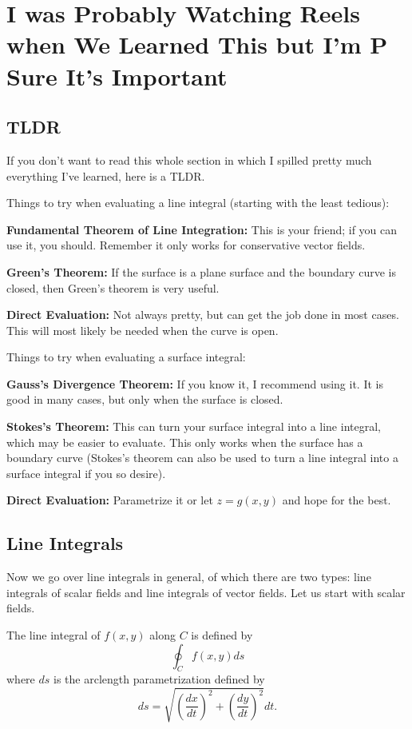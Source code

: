 \chapter{I was Probably Watching Reels when We Learned This but I'm P Sure It's Important}

\section{TLDR}

If you don't want to read this whole section in which I spilled pretty much everything I've learned, here is a TLDR.

Things to try when evaluating a line integral (starting with the least tedious):

\textbf{Fundamental Theorem of Line Integration:} This is your friend; if you can use it, you should. Remember it only works for conservative vector fields.

\textbf{Green's Theorem:} If the surface is a plane surface and the boundary curve is closed, then Green's theorem is very useful.

\textbf{Direct Evaluation:} Not always pretty, but can get the job done in most cases. This will most likely be needed when the curve is open.

Things to try when evaluating a surface integral:

\textbf{Gauss's Divergence Theorem:} If you know it, I recommend using it. It is good in many cases, but only when the surface is closed.

\textbf{Stokes's Theorem:} This can turn your surface integral into a line integral, which may be easier to evaluate. This only works when the surface has a boundary curve (Stokes's theorem can also be used to turn a line integral into a surface integral if you so desire).

\textbf{Direct Evaluation:} Parametrize it or let $z = g(x, y)$ and hope for the best.

\section{Line Integrals}

Now we go over line integrals in general, of which there are two types: line integrals of scalar fields and line integrals of vector fields. Let us start with scalar fields.

\begin{definition}
    The line integral of $f(x, y)$ along $C$ is defined by
    \[\oint_{C}f(x, y)ds\]
    where $ds$ is the arclength parametrization defined by
    \[ds = \sqrt{\left(\frac{dx}{dt}\right)^{2} + \left(\frac{dy}{dt}\right)^{2}}dt.\]
\end{definition}

